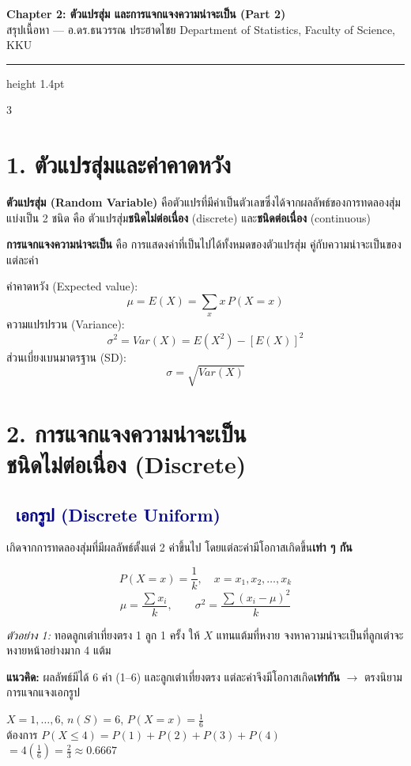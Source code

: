 \documentclass[9pt]{extarticle}
\newcommand{\dist}[1]{\subsection*{\textcolor{navy}{\textbullet\ #1}}}
\begin{document}
\begin{center}
{\Large\bfseries\color{navy} Chapter 2: ตัวแปรสุ่ม และการแจกแจงความน่าจะเป็น (Part 2)}\\[2pt]
{\small สรุปเนื้อหา — อ.ดร.ธนวรรณ ประฮาดไชย \quad Department of Statistics, Faculty of Science, KKU}
\end{center}
\vspace{2pt}
{\color{gold}\hrule height 1.4pt}
\vspace{4pt}

\begin{multicols}{3}

\section*{1. ตัวแปรสุ่มและค่าคาดหวัง}
\textbf{ตัวแปรสุ่ม (Random Variable)} คือ\allowbreak ตัวแปรที่มี\allowbreak ค่าเป็นตัวเลข\allowbreak ซึ่งได้จาก\allowbreak ผลลัพธ์ของ\allowbreak การทดลองสุ่ม แบ่งเป็น 2 ชนิด คือ ตัวแปรสุ่ม\textbf{ชนิดไม่ต่อเนื่อง} (discrete) และ\textbf{ชนิดต่อเนื่อง} (continuous)

\textbf{การแจกแจงความน่าจะเป็น} คือ การแสดง\allowbreak ค่าที่เป็นไปได้\allowbreak ทั้งหมดของ\allowbreak ตัวแปรสุ่ม คู่กับ\allowbreak ความน่าจะเป็น\allowbreak ของแต่ละค่า

\begin{formulabox}
ค่าคาดหวัง (Expected value):
$$\mu = E(X) = \sum_x x\,P(X{=}x)$$
ความแปรปรวน (Variance):
$$\sigma^2 = Var(X) = E(X^2)-[E(X)]^2$$
ส่วนเบี่ยงเบนมาตรฐาน (SD):
$$\sigma = \sqrt{Var(X)}$$
\end{formulabox}

\section*{2. การแจกแจงความน่าจะเป็น\\ชนิดไม่ต่อเนื่อง (Discrete)}

\dist{เอกรูป (Discrete Uniform)}
เกิดจากการทดลองสุ่มที่มีผลลัพธ์ตั้งแต่ 2 ค่าขึ้นไป โดยแต่ละค่ามีโอกาสเกิดขึ้น\textbf{เท่า ๆ กัน}
\begin{formulabox}
$$P(X{=}x)=\dfrac{1}{k},\quad x=x_1,x_2,\dots,x_k$$
$$\mu=\dfrac{\sum x_i}{k}, \qquad \sigma^2=\dfrac{\sum (x_i-\mu)^2}{k}$$
\end{formulabox}

\textit{ตัวอย่าง 1:} ทอดลูกเต๋าเที่ยงตรง 1 ลูก 1 ครั้ง ให้ $X$ แทนแต้มที่หงาย จงหาความน่าจะเป็นที่ลูกเต๋าจะหงายหน้าอย่างมาก 4 แต้ม
\begin{ideabox}
\textbf{แนวคิด:} ผลลัพธ์มีได้ 6 ค่า (1--6) และลูกเต๋า\allowbreak เที่ยงตรง แต่ละค่าจึงมีโอกาส\allowbreak เกิด\textbf{เท่ากัน} $\to$ ตรงนิยาม\allowbreak การแจกแจง\allowbreak เอกรูป
\end{ideabox}
\begin{solbox}
$X=1,\dots,6$, $n(S)=6$, $P(X{=}x)=\frac16$\\
ต้องการ $P(X\le4)=P(1){+}P(2){+}P(3){+}P(4)$\\
$=4\left(\frac16\right)=\frac{2}{3}\approx 0.6667$
\end{solbox}


\end{multicols}
\end{document}
